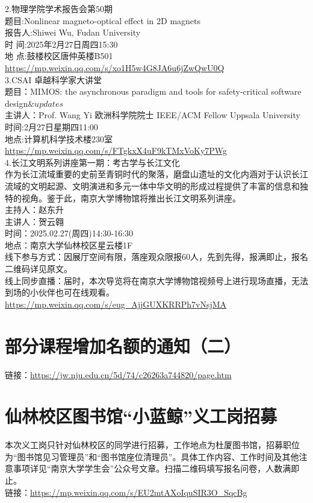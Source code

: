 \documentclass[letterpaper, 12pt]{article}
\begin{document}
\begin{multicols}{2}
2.物理学院学术报告会\(第50期\)\\
题目:Nonlinear magneto-optical effect in 2D magnets\\
报告人:Shiwei Wu, Fudan University\\
时 间:2025年2月27日\(周四\)15:30\\
地 点:鼓楼校区唐仲英楼B501\\
\url{https://mp.weixin.qq.com/s/xo1H5w4G8JA6u6jZwQwU0Q}\\

3.CSAI 卓越科学家大讲堂\\
题目：MIMOS: the asynchronous paradigm and tools for safety-critical software design\(\& updates\)\\
主讲人：Prof. Wang Yi 欧洲科学院院士 IEEE/ACM Fellow Uppsala University\\
时间:2月27日\(星期四\)11:00\\
地点:计算机科学技术楼230室\\
\url{https://mp.weixin.qq.com/s/FTgkxX4uF9kTMxVoKy7PWg}\\

4.长江文明系列讲座第一期：考古学与长江文化\\
作为长江流域重要的史前至青铜时代的聚落，磨盘山遗址的文化内涵对于认识长江流域的文明起源、文明演进和多元一体中华文明的形成过程提供了丰富的信息和独特的视角。鉴于此，南京大学博物馆将推出长江文明系列讲座。\\
主持人：赵东升\\
主讲人：贺云翱\\
时间：2025.02.27(周四)14:30-16:30\\
地点：南京大学仙林校区星云楼1F\\
线下参与方式：因展厅空间有限，落座观众限报60人，先到先得，报满即止，报名二维码详见原文。\\
线上同步直播：届时，本次导览将在南京大学博物馆视频号上进行现场直播，无法到场的小伙伴也可在线观看。\\
\url{https://mp.weixin.qq.com/s/eug_AjjGUXKRRPh7vNsjMA}
\section{部分课程增加名额的通知（二）}
链接：\url{https://jw.nju.edu.cn/5d/74/c26263a744820/page.htm}\\

\section{仙林校区图书馆“小蓝鲸”义工岗招募}
本次义工岗只针对仙林校区的同学进行招募，工作地点为杜厦图书馆，招募职位为“图书馆见习管理员”和“图书馆座位清理员”。具体工作内容、工作时间及其他注意事项详见“南京大学学生会”公众号文章。扫描二维码填写报名问卷，人数满即止。\\
链接：\url{https://mp.weixin.qq.com/s/EU2mtAXoIquSIR3O_SqcBg}\\


\end{multicols}
\end{document}
